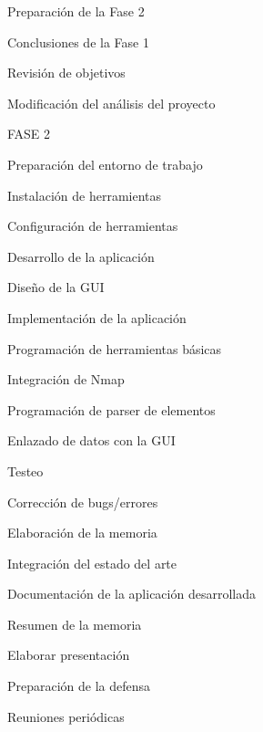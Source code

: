 \begin{numbered}
\begin{numbered}
		\item Preparación de la Fase 2
		\begin{numbered}
			\item Conclusiones de la Fase 1
			\item Revisión de objetivos
			\item Modificación del análisis del proyecto
		\end{numbered}
	\end{numbered}
	
	\item FASE 2
	\begin{numbered}
		\item Preparación del entorno de trabajo
		\begin{numbered}
			\item Instalación de herramientas
			\item Configuración de herramientas
		\end{numbered}
		
		\item Desarrollo de la aplicación
		\begin{numbered}
			\item Diseño de la GUI
			\item Implementación de la aplicación
			\begin{numbered}
				\item Programación de herramientas básicas
				\item Integración de Nmap
				\item Programación de parser de elementos
				\item Enlazado de datos con la GUI
			\end{numbered}
			\item Testeo
			\item Corrección de bugs/errores
		\end{numbered}
	\end{numbered}
	
	\item Elaboración de la memoria
	\begin{numbered}
		\item Integración del estado del arte
		\item Documentación de la aplicación desarrollada
		\item Resumen de la memoria
		\item Elaborar presentación
		\item Preparación de la defensa
	\end{numbered}
	
	\item Reuniones periódicas
\end{numbered}

